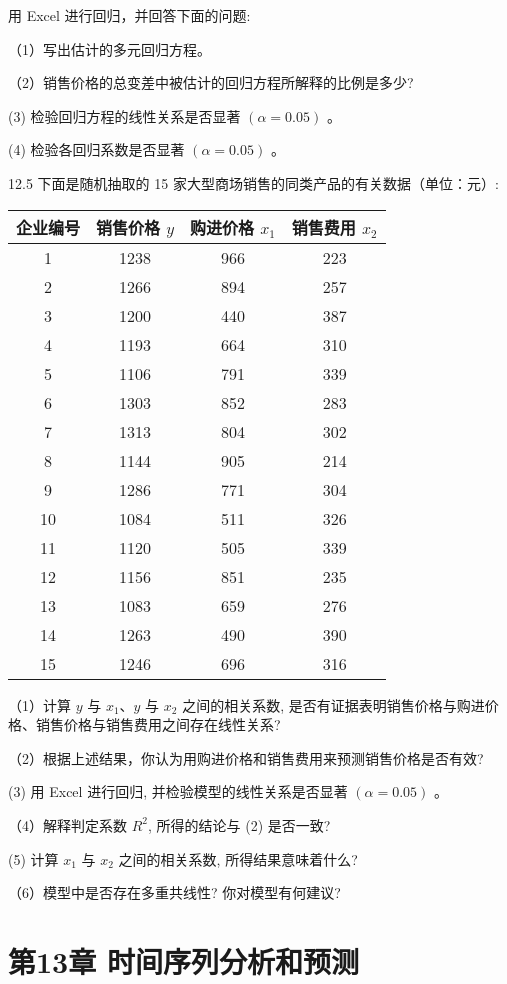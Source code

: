 \documentclass[10pt]{article}
\begin{document}
\begin{CJK*}{UTF8}{bsmi}
用 Excel 进行回归，并回答下面的问题:

（1）写出估计的多元回归方程。

（2）销售价格的总变差中被估计的回归方程所解释的比例是多少?

(3) 检验回归方程的线性关系是否显著 $(\alpha=0.05)$ 。

(4) 检验各回归系数是否显著 $(\alpha=0.05)$ 。

12.5 下面是随机抽取的 15 家大型商场销售的同类产品的有关数据（单位：元）:

\begin{center}
\begin{tabular}{cccc}
\hline
企业编号 & 销售价格 $y$ & 购进价格 $x_{1}$ & 销售费用 $x_{2}$ \\
\hline
1 & 1238 & 966 & 223 \\
2 & 1266 & 894 & 257 \\
3 & 1200 & 440 & 387 \\
4 & 1193 & 664 & 310 \\
5 & 1106 & 791 & 339 \\
6 & 1303 & 852 & 283 \\
7 & 1313 & 804 & 302 \\
8 & 1144 & 905 & 214 \\
9 & 1286 & 771 & 304 \\
10 & 1084 & 511 & 326 \\
11 & 1120 & 505 & 339 \\
12 & 1156 & 851 & 235 \\
13 & 1083 & 659 & 276 \\
14 & 1263 & 490 & 390 \\
15 & 1246 & 696 & 316 \\
\hline
\end{tabular}
\end{center}

（1）计算 $y$ 与 $x_{1} 、 y$ 与 $x_{2}$ 之间的相关系数, 是否有证据表明销售价格与购进价格、销售价格与销售费用之间存在线性关系?

（2）根据上述结果，你认为用购进价格和销售费用来预测销售价格是否有效?

(3) 用 Excel 进行回归, 并检验模型的线性关系是否显著 $(\alpha=0.05)$ 。

（4）解释判定系数 $R^{2}$, 所得的结论与 (2) 是否一致?

(5) 计算 $x_{1}$ 与 $x_{2}$ 之间的相关系数, 所得结果意味着什么?

（6）模型中是否存在多重共线性? 你对模型有何建议?

\section*{第13章 时间序列分析和预测}
\begin{center}
\end{center}


\end{CJK*}
\end{document}
